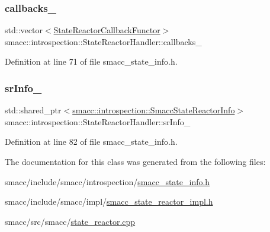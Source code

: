 \subsubsection{\texorpdfstring{callbacks\+\_\+}{callbacks\_}}
{\footnotesize\ttfamily std\+::vector$<$\hyperlink{structsmacc_1_1introspection_1_1StateReactorCallbackFunctor}{State\+Reactor\+Callback\+Functor}$>$ smacc\+::introspection\+::\+State\+Reactor\+Handler\+::callbacks\+\_\+\hspace{0.3cm}{\ttfamily [private]}}



Definition at line 71 of file smacc\+\_\+state\+\_\+info.\+h.

\mbox{\label{classsmacc_1_1introspection_1_1StateReactorHandler_a30bb48cbd4712aff2683c21b85ef3e8e}} 
\subsubsection{\texorpdfstring{sr\+Info\+\_\+}{srInfo\_}}
{\footnotesize\ttfamily std\+::shared\+\_\+ptr$<$\hyperlink{structsmacc_1_1introspection_1_1SmaccStateReactorInfo}{smacc\+::introspection\+::\+Smacc\+State\+Reactor\+Info}$>$ smacc\+::introspection\+::\+State\+Reactor\+Handler\+::sr\+Info\+\_\+}



Definition at line 82 of file smacc\+\_\+state\+\_\+info.\+h.



The documentation for this class was generated from the following files\+:\begin{DoxyCompactItemize}
\item 
smacc/include/smacc/introspection/\hyperlink{smacc__state__info_8h}{smacc\+\_\+state\+\_\+info.\+h}\item 
smacc/include/smacc/impl/\hyperlink{smacc__state__reactor__impl_8h}{smacc\+\_\+state\+\_\+reactor\+\_\+impl.\+h}\item 
smacc/src/smacc/\hyperlink{state__reactor_8cpp}{state\+\_\+reactor.\+cpp}\end{DoxyCompactItemize}
